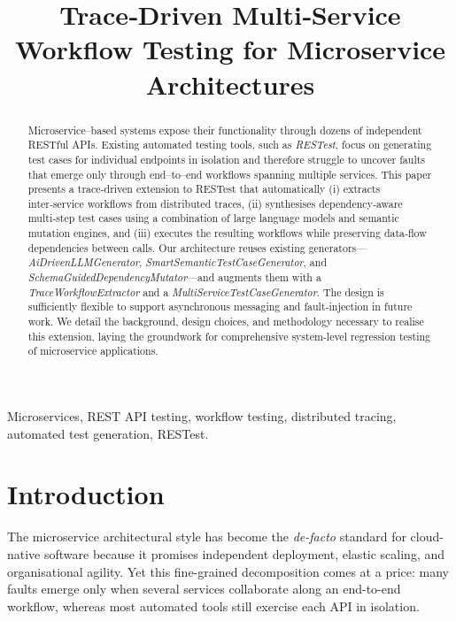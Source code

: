 \documentclass[conference]{IEEEtran}
\title{Trace‑Driven Multi‑Service Workflow Testing for Microservice Architectures}
\author{\IEEEauthorblockN{Tingshuo Miao}\IEEEauthorblockA{Department of Computer Science\\Baylor University, USA\\Email: tingshuo\_miao2@baylor.edu}}
\begin{document}
\maketitle

\begin{abstract}
Microservice--based systems expose their functionality through dozens of independent RESTful APIs. Existing automated testing tools, such as \textit{RESTest}, focus on generating test cases for individual endpoints in isolation and therefore struggle to uncover faults that emerge only through end--to--end workflows spanning multiple services. This paper presents a trace‑driven extension to RESTest that automatically (i) extracts inter‑service workflows from distributed traces, (ii) synthesises dependency‑aware multi‑step test cases using a combination of large language models and semantic mutation engines, and (iii) executes the resulting workflows while preserving data‑flow dependencies between calls. Our architecture reuses existing generators—\textit{AiDrivenLLMGenerator}, \textit{SmartSemanticTestCaseGenerator}, and \textit{SchemaGuidedDependencyMutator}—and augments them with a \textit{TraceWorkflowExtractor} and a \textit{MultiServiceTestCaseGenerator}. The design is sufficiently flexible to support asynchronous messaging and fault‑injection in future work. We detail the background, design choices, and methodology necessary to realise this extension, laying the groundwork for comprehensive system‑level regression testing of microservice applications.
\end{abstract}

\begin{IEEEkeywords}
Microservices, REST API testing, workflow testing, distributed tracing, automated test generation, RESTest.
\end{IEEEkeywords}

\section{Introduction}
The microservice architectural style has become the \emph{de-facto}
standard for cloud-native software because it promises independent
deployment, elastic scaling, and organisational agility.  Yet this
fine-grained decomposition comes at a price: many faults emerge only
when several services collaborate along an end-to-end workflow, whereas
most automated tools still exercise each API in isolation.
\end{document}
